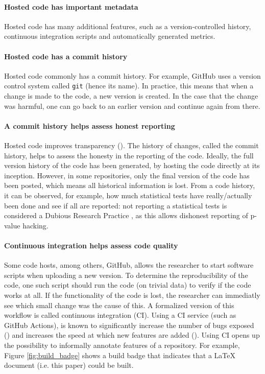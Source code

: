 \paragraph{Hosted code has important metadata}

Hosted code has many additional features, such as
a version-controlled history, continuous integration scripts
and automatically generated metrics.

\paragraph{Hosted code has a commit history}

Hosted code commonly has a commit history. For example, GitHub
uses a version control system called \verb|git| (hence its name).
In practice, this means that when a change is made to the code,
a new version is created. In the case that the change was harmful,
one can go back to an earlier version and continue again from there.

\paragraph{A commit history helps assess honest reporting}

Hosted code improves transparency (\cite{gorgolewski2016practical}).
The history of changes, called the commit history, 
helps to assess the honesty in the reporting of the code. 
Ideally, the full version history of the code 
has been generated, by hosting the code directly at its inception.
However, in some repositories, only the final version of the code has been
posted, which means all historical information is lost.
From a code history, it can be observed, for example, 
how much statistical tests have really/actually been done 
and see if all are reported:
not reporting a statistical tests is considered a Dubious Research Practice 
, as this allows dishonest reporting of p-value hacking.

\paragraph{Continuous integration helps assess code quality}

Some code hosts, among others, GitHub, 
allows the researcher to start software scripts when uploading a new version.
To determine the reproducibility of the code, one such script should
run the code (on trivial data) to verify if the code works at all.
If the functionality of the code is lost, the researcher
can immediatly see which small change was the cause of this.
A formalized version of this workflow is called continuous integration (CI).
Using a CI service (such as GitHub Actions), is known to significantly 
increase the number of bugs exposed (\cite{vasilescu2015}) and increases
the speed at which new features are added (\cite{vasilescu2015}).
Using CI opens up the possibility to informally annotate features of
a repository. For example, Figure \ref{fig:build_badge} shows a 
build badge that indicates that a LaTeX document (i.e. this paper)
could be built.

